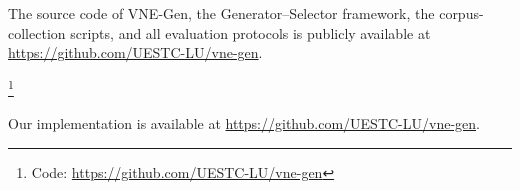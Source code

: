 

The source code of VNE-Gen, the Generator--Selector framework, the corpus-collection scripts, and all
evaluation protocols is publicly available at \url{https://github.com/UESTC-LU/vne-gen}.

\footnote{Code: \url{https://github.com/UESTC-LU/vne-gen}}

Our implementation is available at \url{https://github.com/UESTC-LU/vne-gen}.
